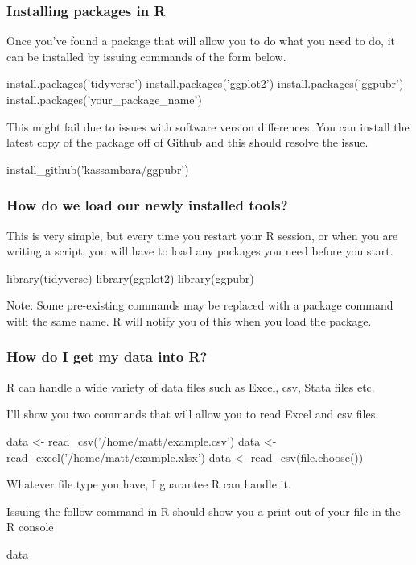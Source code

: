 \documentclass[aspectratio=169]{beamer}
\begin{document}
	\begin{frame}[fragile]
		
		\frametitle{Installing packages in R}
		
		Once you've found a package that will allow you to do what you need to do, it can be installed by issuing commands of the form below.
	
		\begin{semiverbatim}
        install.packages('tidyverse')
        install.packages('ggplot2')
        install.packages('ggpubr')
        install.packages('your_package_name')
		\end{semiverbatim}
	
		This might fail due to issues with software version differences. You can install the latest copy of the package off of Github and this should resolve the issue.
		
		\begin{semiverbatim}
        install_github('kassambara/ggpubr')
		\end{semiverbatim}
	
	\end{frame}
    
    \begin{frame}[fragile]
    	\frametitle{How do we load our newly installed tools?}
    	
    	This is very simple, but every time you restart your R session, or when you are writing a script, you will have to load any packages you need before you start.
    	
    	\begin{semiverbatim}
        library(tidyverse)
        library(ggplot2)
        library(ggpubr)
    	\end{semiverbatim}
    	
    	Note: Some pre-existing commands may be replaced with a package command with the same name. R will notify you of this when you load the package.
    \end{frame}

	\begin{frame}[fragile]
		\frametitle{How do I get my data into R?}
		
		R can handle a wide variety of data files such as Excel, csv, Stata files etc.
		
		I'll show you two commands that will allow you to read Excel and csv files.
		
		\begin{semiverbatim}
        data <- read_csv('/home/matt/example.csv')
        data <- read_excel('/home/matt/example.xlsx')
        data <- read_csv(file.choose())
		\end{semiverbatim}
		
		Whatever file type you have, I guarantee R can handle it.
		
		Issuing the follow command in R should show you a print out of your file in the R console
		
		\begin{semiverbatim}
        data	
		\end{semiverbatim}
		
	\end{frame}
\end{document}
